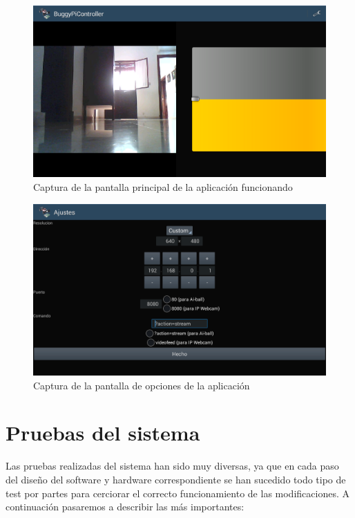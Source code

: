\documentclass{pclass}
\begin{document}
\begin{itemize}
\begin{itemize}
	\begin{figure}[H]
		\centering
		\includegraphics[width=1\textwidth]{img/conectado}
		\caption{Captura de la pantalla principal de la aplicación funcionando}
		\label{fig:capturaConConexion}
	\end{figure}
	
	\begin{figure}[H]
		\centering
		\includegraphics[width=1\textwidth]{img/opciones}
		\caption{Captura de la pantalla de opciones de la aplicación}
		\label{fig:capturaOpciones}
	\end{figure}
	
	
	\medskip
	
\end{itemize}
\end{itemize}

\clearpage
\section{Pruebas del sistema} 

Las pruebas realizadas del sistema han sido muy diversas, ya que en cada paso del diseño del software y hardware correspondiente se han sucedido todo tipo de test por partes para cerciorar el correcto funcionamiento de las modificaciones. A continuación pasaremos a describir las más importantes:
\end{document}
